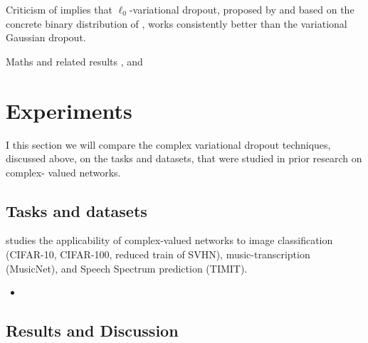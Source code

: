 \documentclass[a4paper,10pt]{article}
\begin{document}
Criticism of \cite{gale_state_2019} implies that $\ell_0$-variational dropout,
proposed by \cite{louizos_learning_2017} and based on the concrete binary distribution
of \cite{maddison_concrete_2016}, works consistently better than the variational
Gaussian dropout.

Maths and related results \cite{pav_moments_2015,taubock_complex-valued_2012},
and \cite{karseras_caution:_nodate}


\section{Experiments} %
\label{sec:Experiments}

I this section we will compare the complex variational dropout techniques, discussed
above, on the tasks and datasets, that were studied in prior research on complex-%
valued networks.

\subsection{Tasks and datasets} %
\label{sub:tasks_and_datasets}

\cite{trabelsi_deep_2017} studies the applicability of complex-valued networks to
image classification (CIFAR-10, CIFAR-100, reduced train of SVHN), music-transcription
(MusicNet), and Speech Spectrum prediction (TIMIT).
\begin{itemize}
  \item 
\end{itemize}


\cite{monning_evaluation_2018}
\cite{jankowski_complex-valued_1996}
\cite{amin_complex-valued_nodate}
\cite{sarroff_complex_nodate}


\subsection{Results and Discussion} %
\label{sub:results_and_discussion}



\clearpage



\nocite{*}
\end{document}
